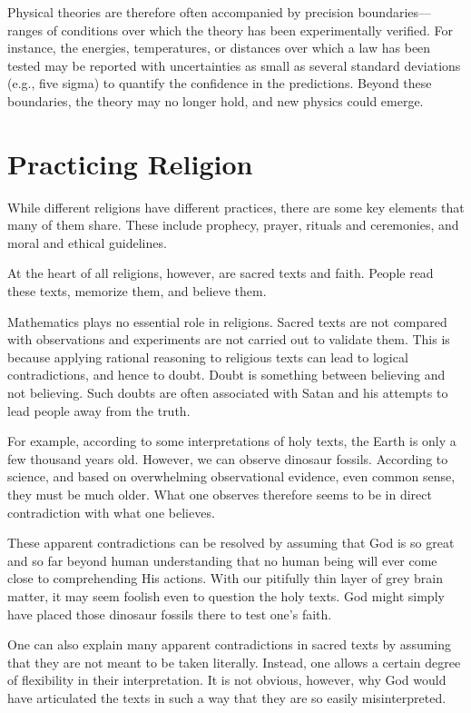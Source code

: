 Physical theories are therefore often accompanied by precision boundaries—ranges of conditions over which the theory has been experimentally verified. 
For instance, the energies, temperatures, or distances over which a law has been tested may be reported with uncertainties as small as several standard deviations (e.g., five sigma) to quantify the confidence in the predictions. 
Beyond these boundaries, the theory may no longer hold, and new physics could emerge.


\section{Practicing Religion}

While different religions have different practices, there are some
key elements that many of them share. These include prophecy,
prayer, rituals and ceremonies, and moral and ethical guidelines.

At the heart of all religions, however, are sacred texts and
faith. People read these texts, memorize them, and believe
them.

Mathematics plays no essential role in religions. Sacred texts are not
compared with observations and  experiments are not carried out to validate them. This is because
applying rational reasoning to religious texts can lead to
logical contradictions, and hence to doubt. Doubt is something
between believing and not believing. Such doubts are often
associated with Satan and his attempts to lead people away
from the truth.

For example, according to some interpretations of holy texts,
the Earth is only a few thousand years old. However, we can
observe dinosaur fossils. According to science, and based on
overwhelming observational evidence, even common sense, they must be much older.
What one observes therefore seems to be in direct contradiction
with what one believes.

These apparent contradictions can be resolved by assuming that
God is so great and so far beyond human understanding that no
human being will ever come close to comprehending His actions.
With our pitifully thin layer of grey brain matter, it may seem
foolish even to question the holy texts. God might simply have
placed those dinosaur fossils there to test one's faith.

One can also explain many apparent contradictions in sacred
texts by assuming that they are not meant to be taken literally.
Instead, one allows a certain degree of flexibility in their
interpretation. It is not obvious, however, why God would have articulated 
the texts in such a way that they are so easily misinterpreted.



